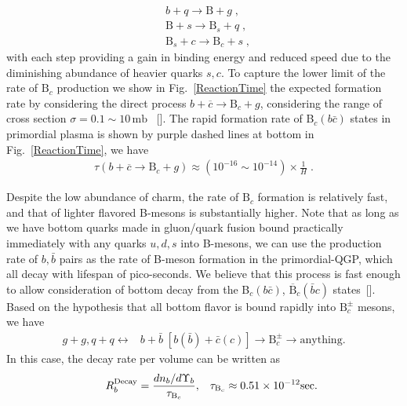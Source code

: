 \begin{align}
&b+q\longrightarrow\mathrm{B}+g\;,\\
&\mathrm{B}+s\longrightarrow\mathrm{B}_s+q\;,\\
&\mathrm{B}_s+c\longrightarrow\mathrm{B}_c+s\;,
\end{align}
with each step providing a gain in binding energy and reduced speed due to the diminishing abundance of heavier quarks $s, c$. To capture the lower limit of the rate of $\mathrm{B}_c$ production we show in Fig.~\ref{ReactionTime} the expected formation rate by considering the direct process $b+\overline c\rightarrow \mathrm{B}_c+g$, considering the range of cross section $\sigma=0.1\sim10\,\mathrm{mb}$ ~[\cite{Schroedter:2000ek}]. The rapid formation rate of B$_c(b\bar c)$ states in primordial plasma is shown by purple dashed lines at bottom in Fig.~\ref{ReactionTime}, we have
\begin{align}
\tau (b+\overline c\rightarrow \mathrm{B}_c+g)\approx(10^{-16}\sim10^{-14})\times\frac{1}{H} \;.
\end{align}

Despite the low abundance of charm, the rate of $\mathrm{B}_c$ formation is relatively fast, and that of lighter flavored B-mesons is substantially higher. Note that as long as we have bottom quarks made in gluon/quark fusion bound practically immediately with any quarks $u, d, s$ into B-mesons, we can use the production rate of $b, \bar b$ pairs as the rate of B-meson formation in the primordial-QGP, which all decay with lifespan of pico-seconds. We believe that this process is fast enough to allow consideration of bottom decay from the B$_c(b\bar c)$, $\overline{\mathrm{B}}_c(\bar b c)$ states~[\cite{Yang:2020nne}].  
 Based on the hypothesis that all bottom flavor is bound rapidly into $\mathrm{B}_c^\pm$ mesons, we have 
\begin{align}\label{Bc_source}
g+g, q+q \longleftrightarrow &b+\bar b\;[b(\bar{b})+\bar{c}(c)]\longrightarrow \mathrm{B}_c^\pm\longrightarrow\mathrm{anything}.
\end{align}
In this case, the decay rate per volume can be written as
\begin{align}\hspace{0.5cm}
 R^{\mathrm{Decay}}_b=\frac{dn_b/d\Upsilon_b}{\tau_{\mathrm{B}_c}},\,\,\,\,\, \tau_{\mathrm{B}_c}\approx0.51\times10^{-12} \mathrm{sec}.
 \end{align}



